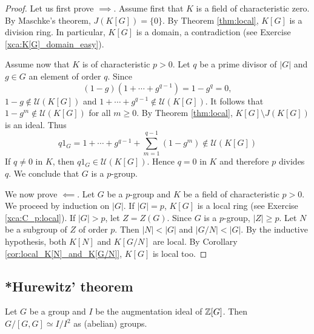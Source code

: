 \begin{proof}
    Let us first prove $\implies$. Assume first that $K$ is a field of characteristic zero. 
    By Maschke's theorem, $J(K[G])=\{0\}$. By Theorem \ref{thm:local}, 
    $K[G]$ is a division ring. In particular, $K[G]$ is a domain, 
    a contradiction (see Exercise \ref{xca:K[G]_domain_easy}).

    Assume now that $K$ is of characteristic $p>0$. 
    Let $q$ be a prime divisor of $|G|$ and $g\in G$ an element of order $q$. 
    Since 
    \[
    (1-g)(1+\cdots+g^{q-1})=1-g^q=0,
    \]
    $1-g\not\in\mathcal{U}(K[G])$ and $1+\cdots+g^{q-1}\not\in\mathcal{U}(K[G])$. It follows
    that $1-g^m\not\in\mathcal{U}(K[G])$ for all $m\geq0$. By Theorem \ref{thm:local}, 
    $K[G]\setminus J(K[G])$ is an ideal. Thus  
    \[
    q1_G=1+\cdots+g^{q-1}+\sum_{m=1}^{q-1}(1-g^m)\not\in\mathcal{U}(K[G])
    \]
    If $q\ne 0$ in $K$, then $q1_G\in\mathcal{U}(K[G])$. Hence $q=0$ in $K$ and
    therefore $p$ divides $q$. We conclude that $G$ is a $p$-group. 

    We now prove $\impliedby$. Let $G$ be a $p$-group and $K$ be a field of characteristic $p>0$. We proceed
    by induction on $|G|$. 
    If $|G|=p$, $K[G]$ is a local ring (see Exercise \ref{xca:C_p:local}).
    If $|G|>p$, let $Z=Z(G)$. Since $G$ is a $p$-group, $|Z|\geq p$. Let $N$ be a subgroup of $Z$ of order $p$. 
    Then $|N|<|G|$ and $|G/N|<|G|$. By the inductive hypothesis, both 
    $K[N]$ and $K[G/N]$ are local. By Corollary \ref{cor:local_K[N]_and_K[G/N]}, $K[G]$ is local too. 
\end{proof}

\subsection{*Hurewitz' theorem}

\begin{theorem}[Hurewicz]
    \label{thm:Hurewicz}
    Let $G$ be a group and $I$ be the augmentation ideal of $\mathbb{Z}[G]$. 
    Then $G/[G,G]\simeq I/I^2$ as (abelian) groups. 
\end{theorem}

